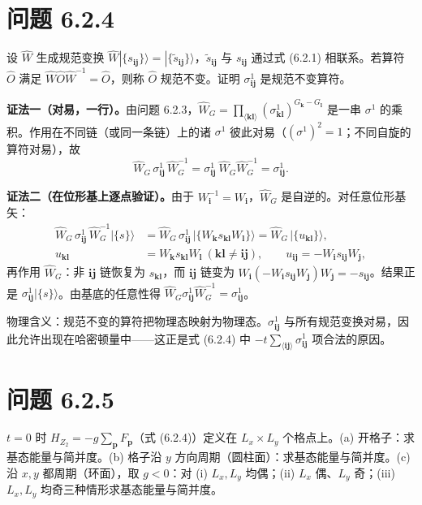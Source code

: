 \section*{问题 6.2.4}
\begin{problem}
设 $\hat W$ 生成规范变换 $\hat W|\{s_{\pmb{ij}}\}\rangle=|\{\tilde s_{\pmb{ij}}\}\rangle$，$\tilde s_{\pmb{ij}}$ 与 $s_{\pmb{ij}}$ 通过式 (6.2.1) 相联系。若算符 $\hat O$ 满足 $\hat W\hat O\hat W^{-1}=\hat O$，则称 $\hat O$ 规范不变。证明 $\sigma^1_{\pmb{ij}}$ 是规范不变算符。
\end{problem}
\solution

\textbf{证法一（对易，一行）。}由问题 6.2.3，$\hat W_G=\prod_{\langle\pmb{kl}\rangle}(\sigma^1_{\pmb{kl}})^{G_{\pmb k}-G_{\pmb l}}$ 是一串 $\sigma^1$ 的乘积。作用在不同链（或同一条链）上的诸 $\sigma^1$ 彼此对易（$(\sigma^1)^2=1$；不同自旋的算符对易），故
\begin{equation*}
\hat W_G\,\sigma^1_{\pmb{ij}}\,\hat W_G^{-1}
=\sigma^1_{\pmb{ij}}\ \hat W_G\hat W_G^{-1}
=\sigma^1_{\pmb{ij}} .
\end{equation*}

\textbf{证法二（在位形基上逐点验证）。}由于 $W_{\pmb i}^{-1}=W_{\pmb i}$，$\hat W_G$ 是自逆的。对任意位形基矢：
\begin{align*}
\hat W_G\,\sigma^1_{\pmb{ij}}\,\hat W_G^{-1}|\{s\}\rangle
&=\hat W_G\,\sigma^1_{\pmb{ij}}\,|\{W_{\pmb k}s_{\pmb{kl}}W_{\pmb l}\}\rangle
=\hat W_G\,\bigl|\{u_{\pmb{kl}}\}\bigr\rangle,\\
u_{\pmb{kl}}&=W_{\pmb k}s_{\pmb{kl}}W_{\pmb l}\ (\pmb{kl}\neq\pmb{ij}),
\qquad
u_{\pmb{ij}}=-W_{\pmb i}s_{\pmb{ij}}W_{\pmb j},
\end{align*}
再作用 $\hat W_G$：非 $\pmb{ij}$ 链恢复为 $s_{\pmb{kl}}$，而 $\pmb{ij}$ 链变为 $W_{\pmb i}(-W_{\pmb i}s_{\pmb{ij}}W_{\pmb j})W_{\pmb j}=-s_{\pmb{ij}}$。结果正是 $\sigma^1_{\pmb{ij}}|\{s\}\rangle$。由基底的任意性得 $\hat W_G\sigma^1_{\pmb{ij}}\hat W_G^{-1}=\sigma^1_{\pmb{ij}}$。

物理含义：规范不变的算符把物理态映射为物理态。$\sigma^1_{\pmb{ij}}$ 与所有规范变换对易，因此允许出现在哈密顿量中——这正是式 (6.2.4) 中 $-t\sum_{\langle\pmb{ij}\rangle}\sigma^1_{\pmb{ij}}$ 项合法的原因。

\section*{问题 6.2.5}
\begin{problem}
$t=0$ 时 $H_{Z_2}=-g\sum_{\pmb p}F_{\pmb p}$（式 (6.2.4)）定义在 $L_x\times L_y$ 个格点上。(a) 开格子：求基态能量与简并度。(b) 格子沿 $y$ 方向周期（圆柱面）：求基态能量与简并度。(c) 沿 $x,y$ 都周期（环面），取 $g<0$：对 (i) $L_x,L_y$ 均偶；(ii) $L_x$ 偶、$L_y$ 奇；(iii) $L_x,L_y$ 均奇三种情形求基态能量与简并度。
\end{problem}
\solution

